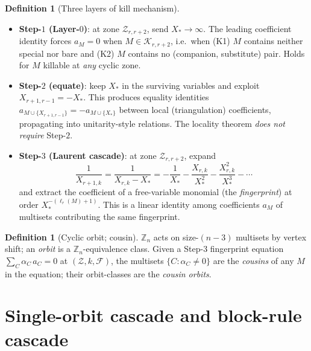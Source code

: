 \documentclass[11pt]{article}
\theoremstyle{definition}
\newtheorem{defn}[thm]{Definition}
\begin{document}
\begin{defn}[Three layers of kill mechanism]\label{def:layers}\leavevmode\\[-1.2em]
\begin{itemize}[leftmargin=*]
\item \textbf{Step-$1$ (Layer-$0$)}: at zone $\mathcal Z_{r,r+2}$,
send $X_*\to\infty$. The leading coefficient identity forces
$a_M=0$ when $M\in\mathcal K_{r,r+2}$, i.e.\ when (K1) $M$ contains
neither special nor bare and (K2) $M$ contains no
(companion, substitute) pair. Holds for $M$ killable at \emph{any}
cyclic zone.

\item \textbf{Step-$2$ (equate)}: keep $X_*$ in the surviving
variables and exploit $X_{r+1,r-1}=-X_*$. This produces equality
identities $a_{M\cup\{X_{r+1,r-1}\}}=-a_{M\cup\{X_*\}}$ between
local (triangulation) coefficients, propagating into
unitarity-style relations. The locality theorem \emph{does not
require} Step-$2$.

\item \textbf{Step-$3$ (Laurent cascade)}: at zone
$\mathcal Z_{r,r+2}$, expand
\[
\frac{1}{X_{r+1,k}}=\frac{1}{X_{r,k}-X_*}
=-\frac{1}{X_*}-\frac{X_{r,k}}{X_*^2}-\frac{X_{r,k}^2}{X_*^3}-\cdots
\]
and extract the coefficient of a free-variable monomial (the
\emph{fingerprint}) at order $X_*^{-(\ell_r(M)+1)}$. This is a
linear identity among coefficients $a_M$ of multisets contributing
the same fingerprint.
\end{itemize}
\end{defn}

\begin{defn}[Cyclic orbit; cousin]\label{def:orbit}
$\mathbb Z_n$ acts on size-$(n-3)$ multisets by vertex shift; an
\emph{orbit} is a $\mathbb Z_n$-equivalence class. Given a Step-$3$
fingerprint equation $\sum_C\alpha_C\,a_C=0$ at
$(\mathcal Z, k, \mathcal F)$, the multisets
$\{C:\alpha_C\ne 0\}$ are the \emph{cousins} of any $M$ in the
equation; their orbit-classes are the \emph{cousin orbits}.
\end{defn}

\section{Single-orbit cascade and block-rule cascade}\label{sec:cascades}
\end{document}
